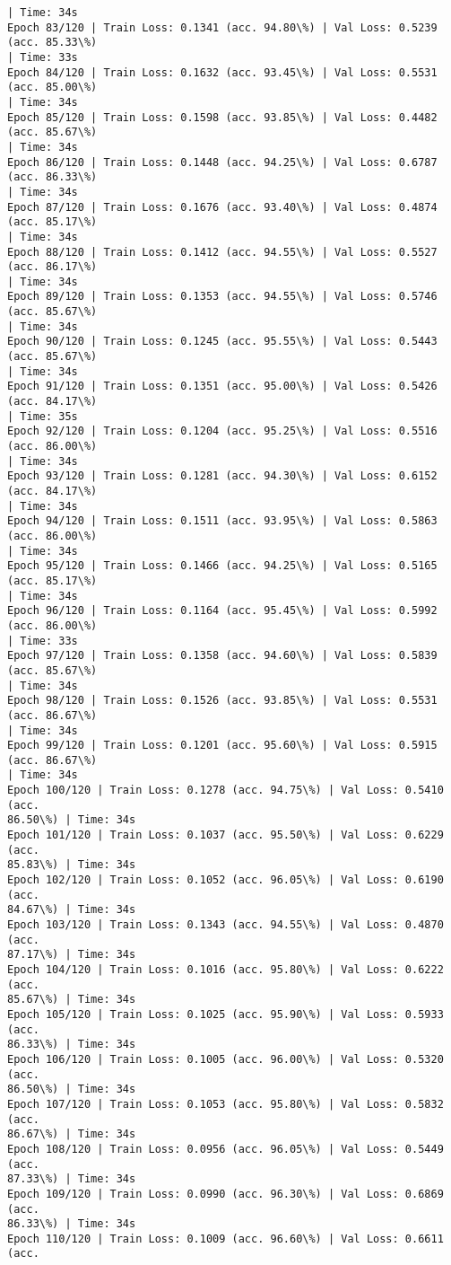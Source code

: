 \documentclass[8pt]{extarticle}
\begin{document}
\begin{Verbatim}[commandchars=\\\{\}]
| Time: 34s
Epoch 83/120 | Train Loss: 0.1341 (acc. 94.80\%) | Val Loss: 0.5239 (acc. 85.33\%)
| Time: 33s
Epoch 84/120 | Train Loss: 0.1632 (acc. 93.45\%) | Val Loss: 0.5531 (acc. 85.00\%)
| Time: 34s
Epoch 85/120 | Train Loss: 0.1598 (acc. 93.85\%) | Val Loss: 0.4482 (acc. 85.67\%)
| Time: 34s
Epoch 86/120 | Train Loss: 0.1448 (acc. 94.25\%) | Val Loss: 0.6787 (acc. 86.33\%)
| Time: 34s
Epoch 87/120 | Train Loss: 0.1676 (acc. 93.40\%) | Val Loss: 0.4874 (acc. 85.17\%)
| Time: 34s
Epoch 88/120 | Train Loss: 0.1412 (acc. 94.55\%) | Val Loss: 0.5527 (acc. 86.17\%)
| Time: 34s
Epoch 89/120 | Train Loss: 0.1353 (acc. 94.55\%) | Val Loss: 0.5746 (acc. 85.67\%)
| Time: 34s
Epoch 90/120 | Train Loss: 0.1245 (acc. 95.55\%) | Val Loss: 0.5443 (acc. 85.67\%)
| Time: 34s
Epoch 91/120 | Train Loss: 0.1351 (acc. 95.00\%) | Val Loss: 0.5426 (acc. 84.17\%)
| Time: 35s
Epoch 92/120 | Train Loss: 0.1204 (acc. 95.25\%) | Val Loss: 0.5516 (acc. 86.00\%)
| Time: 34s
Epoch 93/120 | Train Loss: 0.1281 (acc. 94.30\%) | Val Loss: 0.6152 (acc. 84.17\%)
| Time: 34s
Epoch 94/120 | Train Loss: 0.1511 (acc. 93.95\%) | Val Loss: 0.5863 (acc. 86.00\%)
| Time: 34s
Epoch 95/120 | Train Loss: 0.1466 (acc. 94.25\%) | Val Loss: 0.5165 (acc. 85.17\%)
| Time: 34s
Epoch 96/120 | Train Loss: 0.1164 (acc. 95.45\%) | Val Loss: 0.5992 (acc. 86.00\%)
| Time: 33s
Epoch 97/120 | Train Loss: 0.1358 (acc. 94.60\%) | Val Loss: 0.5839 (acc. 85.67\%)
| Time: 34s
Epoch 98/120 | Train Loss: 0.1526 (acc. 93.85\%) | Val Loss: 0.5531 (acc. 86.67\%)
| Time: 34s
Epoch 99/120 | Train Loss: 0.1201 (acc. 95.60\%) | Val Loss: 0.5915 (acc. 86.67\%)
| Time: 34s
Epoch 100/120 | Train Loss: 0.1278 (acc. 94.75\%) | Val Loss: 0.5410 (acc.
86.50\%) | Time: 34s
Epoch 101/120 | Train Loss: 0.1037 (acc. 95.50\%) | Val Loss: 0.6229 (acc.
85.83\%) | Time: 34s
Epoch 102/120 | Train Loss: 0.1052 (acc. 96.05\%) | Val Loss: 0.6190 (acc.
84.67\%) | Time: 34s
Epoch 103/120 | Train Loss: 0.1343 (acc. 94.55\%) | Val Loss: 0.4870 (acc.
87.17\%) | Time: 34s
Epoch 104/120 | Train Loss: 0.1016 (acc. 95.80\%) | Val Loss: 0.6222 (acc.
85.67\%) | Time: 34s
Epoch 105/120 | Train Loss: 0.1025 (acc. 95.90\%) | Val Loss: 0.5933 (acc.
86.33\%) | Time: 34s
Epoch 106/120 | Train Loss: 0.1005 (acc. 96.00\%) | Val Loss: 0.5320 (acc.
86.50\%) | Time: 34s
Epoch 107/120 | Train Loss: 0.1053 (acc. 95.80\%) | Val Loss: 0.5832 (acc.
86.67\%) | Time: 34s
Epoch 108/120 | Train Loss: 0.0956 (acc. 96.05\%) | Val Loss: 0.5449 (acc.
87.33\%) | Time: 34s
Epoch 109/120 | Train Loss: 0.0990 (acc. 96.30\%) | Val Loss: 0.6869 (acc.
86.33\%) | Time: 34s
Epoch 110/120 | Train Loss: 0.1009 (acc. 96.60\%) | Val Loss: 0.6611 (acc.

\end{Verbatim}
\end{document}
